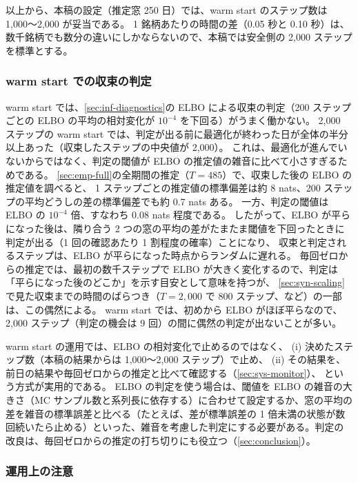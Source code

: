 以上から、本稿の設定（推定窓 250 日）では、warm start のステップ数は 1,000〜2,000 が妥当である。
1 銘柄あたりの時間の差（0.05 秒と 0.10 秒）は、数千銘柄でも数分の違いにしかならないので、本稿では安全側の 2,000 ステップを標準とする。


\subsubsection{warm start での収束の判定}

warm start では、\cref{sec:inf-diagnostics}の ELBO による収束の判定（200 ステップごとの ELBO の平均の相対変化が $10^{-4}$ を下回る）がうまく働かない。
2,000 ステップの warm start では、判定が出る前に最適化が終わった日が全体の半分以上あった（収束したステップの中央値が 2,000）。
これは、最適化が進んでいないからではなく、判定の閾値が ELBO の推定値の雑音に比べて小さすぎるためである。
\cref{sec:emp-full}の全期間の推定（$T = 485$）で、収束した後の ELBO の推定値を調べると、
1 ステップごとの推定値の標準偏差は約 8 nats、200 ステップの平均どうしの差の標準偏差でも約 0.7 nats ある。
一方、判定の閾値は ELBO の $10^{-4}$ 倍、すなわち $0.08$ nats 程度である。
したがって、ELBO が平らになった後は、隣り合う 2 つの窓の平均の差がたまたま閾値を下回ったときに判定が出る（1 回の確認あたり 1 割程度の確率）ことになり、
収束と判定されるステップは、ELBO が平らになった時点からランダムに遅れる。
毎回ゼロからの推定では、最初の数千ステップで ELBO が大きく変化するので、判定は「平らになった後のどこか」を示す目安として意味を持つが、
\cref{sec:syn-scaling}で見た収束までの時間のばらつき（$T = 2{,}000$ で 800 ステップ、など）の一部は、この偶然による。
warm start では、初めから ELBO がほぼ平らなので、2,000 ステップ（判定の機会は 9 回）の間に偶然の判定が出ないことが多い。

warm start の運用では、ELBO の相対変化で止めるのではなく、
(i) 決めたステップ数（本稿の結果からは 1,000〜2,000 ステップ）で止め、
(ii) その結果を、前日の結果や毎回ゼロからの推定と比べて確認する（\cref{sec:sys-monitor}）、
という方式が実用的である。
ELBO の判定を使う場合は、閾値を ELBO の雑音の大きさ（MC サンプル数と系列長に依存する）に合わせて設定するか、窓の平均の差を雑音の標準誤差と比べる（たとえば、差が標準誤差の 1 倍未満の状態が数回続いたら止める）といった、雑音を考慮した判定にする必要がある。判定の改良は、毎回ゼロからの推定の打ち切りにも役立つ（\cref{sec:conclusion}）。

\subsubsection{運用上の注意}

